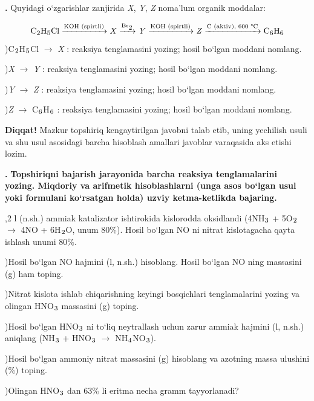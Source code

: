 \documentclass[11pt,a4paper]{article}
\renewcommand{\textsubscript}[1]{\ensuremath{_{\text{\fontsize{8}{8}\selectfont #1}}}}
\newcommand{\qn}[1]{\textbf{\fontsize{11.5}{13}\selectfont #1}}
\newcommand{\qsep}{\par\vspace{1pt}\noindent\rule{0pt}{0.4pt}\par\vspace{5pt}}
\newcommand{\diqqat}[1]{\par\smallskip\noindent\textbf{Diqqat!} #1\par\medskip}
\begin{document}
\noindent\qn{42.} Quyidagi o`zgarishlar zanjirida \textit{X}, \textit{Y}, \textit{Z} noma'lum organik moddalar:\par
\[\setlength{\fboxsep}{0pt}\text{C\textsubscript{2}H\textsubscript{5}Cl}\xrightarrow{\text{KOH (spirtli)}}\text{\textit{X}}\xrightarrow{\text{Br\textsubscript{2}}}\text{\textit{Y}}\xrightarrow{\text{KOH (spirtli)}}\text{\textit{Z}}\xrightarrow{\text{C (aktiv), 600 \textdegree{}C}}\text{C\textsubscript{6}H\textsubscript{6}}\]
)C\textsubscript{2}H\textsubscript{5}Cl $\to$ \textit{X} : reaksiya tenglamasini yozing; hosil bo`lgan moddani nomlang.\par
{})\textit{X} $\to$ \textit{Y} : reaksiya tenglamasini yozing; hosil bo`lgan moddani nomlang.\par
{})\textit{Y} $\to$ \textit{Z} : reaksiya tenglamasini yozing; hosil bo`lgan moddani nomlang.\par
{})\textit{Z} $\to$ C\textsubscript{6}H\textsubscript{6} : reaksiya tenglamasini yozing; hosil bo`lgan moddani nomlang.\par
\diqqat{Mazkur topshiriq kengaytirilgan javobni talab etib, uning yechilish usuli va shu usul asosidagi barcha hisoblash amallari javoblar varaqasida aks etishi lozim.}\qsep
\noindent\qn{43.} \textbf{Topshiriqni bajarish jarayonida barcha reaksiya tenglamalarini yozing. Miqdoriy va arifmetik hisoblashlarni (unga asos bo`lgan usul yoki formulani ko`rsatgan holda) uzviy ketma-ketlikda bajaring.}\par{},2 l (n.sh.) ammiak katalizator ishtirokida kislorodda oksidlandi (4NH\textsubscript{3} + 5O\textsubscript{2} $\to$ 4NO + 6H\textsubscript{2}O, unum 80\%). Hosil bo`lgan NO ni nitrat kislotagacha qayta ishlash unumi 80\%.\par
{})Hosil bo`lgan NO hajmini (l, n.sh.) hisoblang. Hosil bo`lgan NO ning massasini (g) ham toping.\par
{})Nitrat kislota ishlab chiqarishning keyingi bosqichlari tenglamalarini yozing va olingan HNO\textsubscript{3} massasini (g) toping.\par
{})Hosil bo`lgan HNO\textsubscript{3} ni to`liq neytrallash uchun zarur ammiak hajmini (l, n.sh.) aniqlang (NH\textsubscript{3} + HNO\textsubscript{3} $\to$ NH\textsubscript{4}NO\textsubscript{3}).\par
{})Hosil bo`lgan ammoniy nitrat massasini (g) hisoblang va azotning massa ulushini (\%) toping.\par
{})Olingan HNO\textsubscript{3} dan 63\% li eritma necha gramm tayyorlanadi?\par
\end{document}

